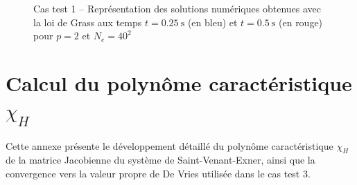 \documentclass[11pt, a4paper, oneside]{report}
\begin{document}
\begin{appendices}
\begin{figure}[H]
    \caption{Cas test 1 -- Représentation des solutions numériques obtenues avec la loi de Grass aux temps $t = \SI{0.25}{\second}$ (en bleu) et $t = \SI{0.5}{\second}$ (en rouge) pour $p = 2$ et $N_e = 40^2$}
    \label{fig:Representation_manufacturee_2D}
\end{figure}

\chapter{Calcul du polynôme caractéristique \texorpdfstring{$\chi_H$}{chi_H}}
\label{annexe:polynome_caracteristique}

Cette annexe présente le développement détaillé du polynôme caractéristique $\chi_H$ de la matrice Jacobienne du système de Saint-Venant-Exner, ainsi que la convergence vers la valeur propre de De Vries utilisée dans le cas test 3.

\allowdisplaybreaks


\end{appendices}
\end{document}
